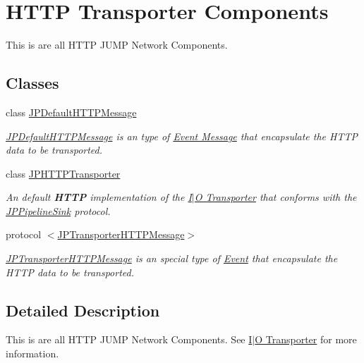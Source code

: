\hypertarget{a00086}{
\section{HTTP Transporter Components}
\label{a00086}
}


This is are all HTTP JUMP Network Components.  


\subsection*{Classes}
\begin{DoxyCompactItemize}
\item 
class \hyperlink{a00012}{JPDefaultHTTPMessage}
\begin{DoxyCompactList}\small\item\em \hyperlink{a00012}{JPDefaultHTTPMessage} is an type of \hyperlink{a00006}{Event Message} that encapsulate the HTTP data to be transported. \item\end{DoxyCompactList}\item 
class \hyperlink{a00014}{JPHTTPTransporter}
\begin{DoxyCompactList}\small\item\em An default {\bfseries HTTP} implementation of the \hyperlink{a00002}{I$|$O Transporter} that conforms with the \hyperlink{a00034}{JPPipelineSink} protocol. \item\end{DoxyCompactList}\item 
protocol \hyperlink{a00040}{$<$JPTransporterHTTPMessage$>$}
\begin{DoxyCompactList}\small\item\em \hyperlink{a00040}{JPTransporterHTTPMessage} is an special type of \hyperlink{a00005}{Event} that encapsulate the HTTP data to be transported. \item\end{DoxyCompactList}\end{DoxyCompactItemize}


\subsection{Detailed Description}
This is are all HTTP JUMP Network Components. See \hyperlink{a00002}{I$|$O Transporter} for more information. 